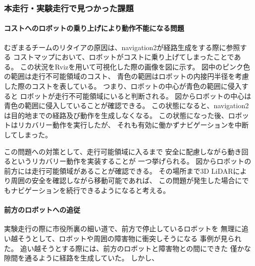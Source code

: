 \subsubsection{本走行・実験走行で見つかった課題}
\paragraph{コストへのロボットの乗り上げにより動作不能になる問題}
むぎまるチームのリタイアの原因は、navigation2が経路生成をする際に参照する
コストマップにおいて、ロボットがコストに乗り上げてしまったことである。
この状況をRvizを用いて可視化した際の画像を図\label{fig:mugimaru_result}に示す。
図中のピンク色の範囲は走行不可能領域のコスト、
青色の範囲はロボットの内接円半径を考慮した際のコストを表している。
つまり、ロボットの中心が青色の範囲に侵入すると
ロボットが走行不可能領域にいると判断される。
図\label{fig:mugimaru_result}からロボットの中心は
青色の範囲に侵入していることが確認できる。
この状態になると、navigation2は目的地までの経路及び動作を生成しなくなる。
この状態になった後、ロボットはリカバリー動作を実行したが、
それも有効に働かずナビゲーションを中断してしまった。

この問題への対策として、走行可能領域に入るまで
安全に配慮しながら動き回るというリカバリー動作を実装することが
一つ挙げられる。
図からロボットの前方には走行可能領域があることが確認できる。
その場所まで3D LiDARにより周囲の安全を確認しながら移動可能であれば、
この問題が発生した場合にでもナビゲーションを続行できるようになると考える。

\paragraph{前方のロボットへの追従}
実験走行の際に市役所裏の細い道で、前方で停止しているロボットを
無理に追い越そうとして、ロボットや周囲の障害物に衝突しそうになる
事例が見られた。
追い越そうとする際には、前方のロボットと障害物との間にできた
僅かな隙間を通るように経路を生成していた。
しかし、



